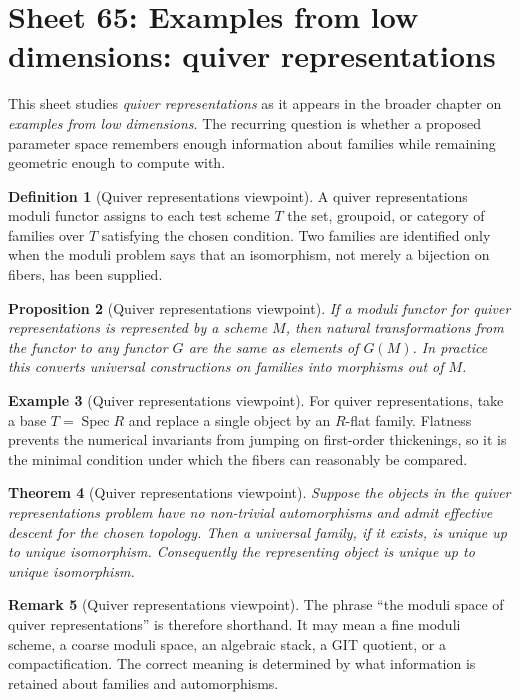 \documentclass[11pt]{amsart}
\newtheorem{theorem}{Theorem}[section]
\newtheorem{proposition}[theorem]{Proposition}
\theoremstyle{definition}
\newtheorem{definition}[theorem]{Definition}
\newtheorem{example}[theorem]{Example}
\newtheorem{remark}[theorem]{Remark}
\newcommand{\Spec}{\operatorname{Spec}}
\begin{document}
\section{Sheet 65: Examples from low dimensions: quiver representations}
This sheet studies \emph{quiver representations} as it appears in the broader chapter on \emph{examples from low dimensions}.  The recurring question is whether a proposed parameter space remembers enough information about families while remaining geometric enough to compute with.
\begin{definition}[Quiver representations viewpoint]
A quiver representations moduli functor assigns to each test scheme $T$ the set, groupoid, or category of families over $T$ satisfying the chosen condition.  Two families are identified only when the moduli problem says that an isomorphism, not merely a bijection on fibers, has been supplied.
\end{definition}
\begin{proposition}[Quiver representations viewpoint]
If a moduli functor for quiver representations is represented by a scheme $M$, then natural transformations from the functor to any functor $G$ are the same as elements of $G(M)$.  In practice this converts universal constructions on families into morphisms out of $M$.
\end{proposition}
\begin{example}[Quiver representations viewpoint]
For quiver representations, take a base $T=\Spec R$ and replace a single object by an $R$-flat family.  Flatness prevents the numerical invariants from jumping on first-order thickenings, so it is the minimal condition under which the fibers can reasonably be compared.
\end{example}
\begin{theorem}[Quiver representations viewpoint]
Suppose the objects in the quiver representations problem have no non-trivial automorphisms and admit effective descent for the chosen topology.  Then a universal family, if it exists, is unique up to unique isomorphism.  Consequently the representing object is unique up to unique isomorphism.
\end{theorem}
\begin{remark}[Quiver representations viewpoint]
The phrase ``the moduli space of quiver representations'' is therefore shorthand.  It may mean a fine moduli scheme, a coarse moduli space, an algebraic stack, a GIT quotient, or a compactification.  The correct meaning is determined by what information is retained about families and automorphisms.
\end{remark}
\end{document}
